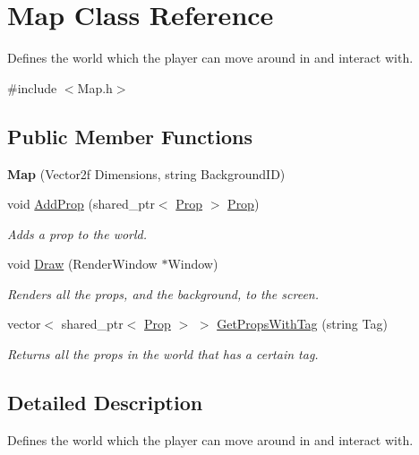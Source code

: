 \hypertarget{class_map}{}\section{Map Class Reference}
\label{class_map}


Defines the world which the player can move around in and interact with.  




{\ttfamily \#include $<$Map.\+h$>$}

\subsection*{Public Member Functions}
\begin{DoxyCompactItemize}
\item 
\mbox{\label{class_map_a446aef181066f72ac57cede14bf074c3}} 
{\bfseries Map} (Vector2f Dimensions, string Background\+ID)
\item 
void \hyperlink{class_map_afc6fdc8687757b818ba754eab7ddd4cb}{Add\+Prop} (shared\+\_\+ptr$<$ \hyperlink{class_prop}{Prop} $>$ \hyperlink{class_prop}{Prop})
\begin{DoxyCompactList}\small\item\em Adds a prop to the world. \end{DoxyCompactList}\item 
void \hyperlink{class_map_ae77582db3c3888918280828f6cc13952}{Draw} (Render\+Window $\ast$Window)
\begin{DoxyCompactList}\small\item\em Renders all the props, and the background, to the screen. \end{DoxyCompactList}\item 
vector$<$ shared\+\_\+ptr$<$ \hyperlink{class_prop}{Prop} $>$ $>$ \hyperlink{class_map_a5699a7168473d092a590ee99dff38b3d}{Get\+Props\+With\+Tag} (string Tag)
\begin{DoxyCompactList}\small\item\em Returns all the props in the world that has a certain tag. \end{DoxyCompactList}\end{DoxyCompactItemize}


\subsection{Detailed Description}
Defines the world which the player can move around in and interact with. 




